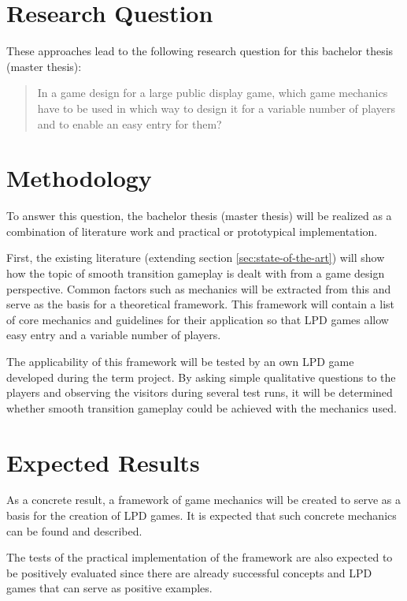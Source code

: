 \section{Research Question}

These approaches lead to the following research question for this bachelor
thesis (master thesis):
%
\begin{quote}
	In a game design for a large public display game, which game mechanics have
	to be used in which way to design it for a variable number of players and to
	enable an easy entry for them?
\end{quote}


\section{Methodology}

To answer this question, the bachelor thesis (master thesis) will be realized
as a combination of literature work and practical or prototypical
implementation.

First, the existing literature (extending section \ref{sec:state-of-the-art})
will show how the topic of smooth transition gameplay is dealt with from a
game design perspective. Common factors such as mechanics will be extracted
from this and serve as the basis for a theoretical framework. This framework
will contain a list of core mechanics and guidelines for their application so
that LPD games allow easy entry and a variable number of players.

The applicability of this framework will be tested by an own LPD game developed
during the term project. By asking simple qualitative questions to the players
and observing the visitors during several test runs, it will be determined
whether smooth transition gameplay could be achieved with the mechanics used.


\section{Expected Results}

As a concrete result, a framework of game mechanics will be created to serve as
a basis for the creation of LPD games. It is expected that such concrete
mechanics can be found and described.

The tests of the practical implementation of the framework are also expected to
be positively evaluated since there are already successful concepts and LPD
games that can serve as positive examples.
